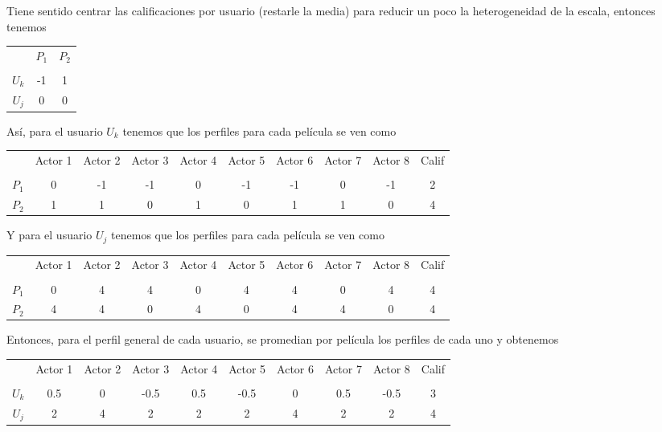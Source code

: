 Tiene sentido centrar las calificaciones por usuario (restarle la media) para reducir un poco la heterogeneidad de la escala, entonces tenemos

\begin{center}
\begin{tabular}{ c | c  c }
    & $P_1$ & $P_2$ \\ \\
  \hline                       
$U_k$ & -1 & 1 \\
$U_j$ & 0 & 0 \\
  \hline  
\end{tabular}
\end{center}

Así, para el usuario $U_k$ tenemos que los perfiles para cada película se ven como

\begin{center}
\begin{tabular}{ c | c  c c c c c c c c}
    & Actor 1 & Actor 2 & Actor 3 & Actor 4 & Actor 5 & Actor 6 & Actor 7 & Actor 8 & Calif \\ \\
  \hline                       
$P_1$ & 0 & -1 & -1 & 0 & -1 & -1 & 0 & -1 & 2 \\
$P_2$ & 1 & 1 & 0 & 1 & 0 & 1 & 1 & 0 & 4 \\
  \hline  
\end{tabular}
\end{center}

Y para el usuario $U_j$ tenemos que los perfiles para cada película se ven como

\begin{center}
\begin{tabular}{ c | c  c c c c c c c c}
    & Actor 1 & Actor 2 & Actor 3 & Actor 4 & Actor 5 & Actor 6 & Actor 7 & Actor 8 & Calif \\ \\
  \hline                       
$P_1$ & 0 & 4 & 4 & 0 & 4 & 4 & 0 & 4 & 4 \\
$P_2$ & 4 & 4 & 0 & 4 & 0 & 4 & 4 & 0 & 4 \\
  \hline  
\end{tabular}
\end{center}

Entonces, para el perfil general de cada usuario, se promedian por película los perfiles de cada uno y obtenemos

\begin{center}
\begin{tabular}{ c | c  c c c c c c c c}
    & Actor 1 & Actor 2 & Actor 3 & Actor 4 & Actor 5 & Actor 6 & Actor 7 & Actor 8 & Calif \\ \\
  \hline                       
$U_k$ & 0.5 & 0 & -0.5 & 0.5 & -0.5 & 0 & 0.5 & -0.5 & 3 \\
$U_j$ & 2 & 4 & 2 & 2 & 2 & 4 & 2 & 2 & 4 \\
  \hline  
\end{tabular}
\end{center}

